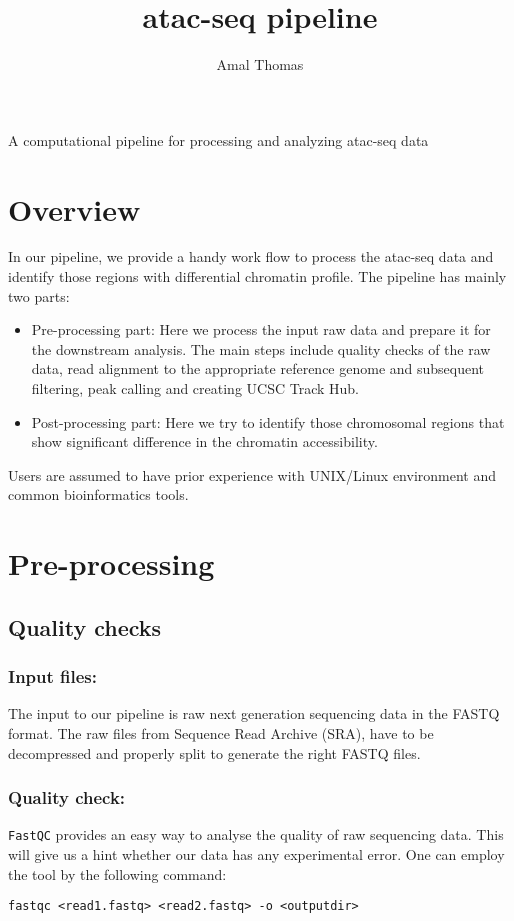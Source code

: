 \documentclass[10pt]{article}
\title{\bf atac-seq pipeline}
\author{Amal Thomas}
\newcommand{\prog}[1]{\texttt{#1}}
\begin{document}
\maketitle

\begin{center}
A computational pipeline for processing and analyzing atac-seq data
\end{center} 

\tableofcontents
\newpage
\section{Overview}
In our pipeline, we provide a handy work flow to process the atac-seq data and identify those regions with differential chromatin profile. The pipeline has mainly two parts:
\begin{itemize}
\item Pre-processing part: Here we process the input raw data and prepare it for the downstream analysis. The main steps include quality checks of the raw data, read alignment to the appropriate reference genome and subsequent filtering, peak calling and creating UCSC Track Hub. 
\item Post-processing part: Here we try to identify those chromosomal regions that show significant difference in the chromatin accessibility. 
\end{itemize}
Users are assumed to have prior experience with UNIX/Linux environment and common bioinformatics tools.

\section{Pre-processing}

\subsection{Quality checks}
\subsubsection{Input files:} The input to our pipeline is raw next generation sequencing data in the FASTQ format. The raw files from Sequence Read Archive (SRA), have to be decompressed and properly split to generate the right FASTQ files.
\subsubsection{Quality check:} \prog{FastQC} provides an easy way to analyse the quality of raw sequencing data. This will give us a hint whether our data has any experimental error. One can employ the tool by the following command:
\begin{verbatim}
fastqc <read1.fastq> <read2.fastq> -o <outputdir>
\end{verbatim}
\end{document}

